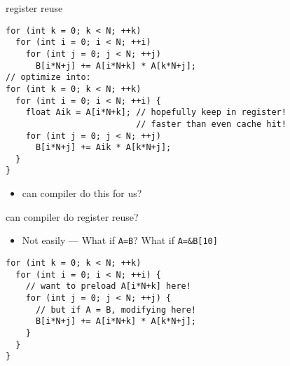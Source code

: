 \begin{frame}[fragile,label=registerReuse]{register reuse}
\lstset{style=small,language=C}
\begin{lstlisting}
for (int k = 0; k < N; ++k)
  for (int i = 0; i < N; ++i)
    for (int j = 0; j < N; ++j)
      B[i*N+j] += A[i*N+k] * A[k*N+j];
// optimize into:
for (int k = 0; k < N; ++k)
  for (int i = 0; i < N; ++i) {
    float Aik = A[i*N+k]; // hopefully keep in register!
                          // faster than even cache hit!
    for (int j = 0; j < N; ++j)
      B[i*N+j] += Aik * A[k*N+j];
  }
}
\end{lstlisting}
\begin{itemize}
\item can compiler do this for us?
\end{itemize}
\end{frame}

\begin{frame}[fragile,label=registerReuseAuto]{can compiler do register reuse?}
\lstset{style=small,language=C}
\begin{itemize}
\item Not easily --- What if \lstinline|A=B|? What if \lstinline|A=&B[10]|
\end{itemize}
\begin{lstlisting}
for (int k = 0; k < N; ++k)
  for (int i = 0; i < N; ++i) {
    // want to preload A[i*N+k] here!
    for (int j = 0; j < N; ++j) {
      // but if A = B, modifying here!
      B[i*N+j] += A[i*N+k] * A[k*N+j];
    }
  }
}
\end{lstlisting}
\end{frame}
